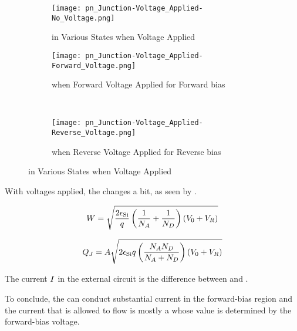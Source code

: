 \begin{figure}[h!tbp]
  \centering
  \begin{subfigure}{0.48\linewidth}
    \centering
    \texttt{[image: pn\_Junction-Voltage\_Applied-No\_Voltage.png]}
    \caption{\PNJunction{} in Various States when Voltage Applied}
    \label{fig:pn_Junction-Voltage_Applied-No_Voltage}
  \end{subfigure}
  \begin{subfigure}{0.48\linewidth}
    \centering
    \texttt{[image: pn\_Junction-Voltage\_Applied-Forward\_Voltage.png]}
    \caption{\PNJunction{} when Forward Voltage Applied for Forward bias}
    \label{fig:pn_Junction-Voltage_Applied-Forward_Voltage}
  \end{subfigure}
  \\
  \begin{subfigure}{0.48\linewidth}
    \centering
    \texttt{[image: pn\_Junction-Voltage\_Applied-Reverse\_Voltage.png]}
    \caption{\PNJunction{} when Reverse Voltage Applied for Reverse bias}
    \label{fig:pn_Junction-Voltage_Applied-Reverse_Voltage}
  \end{subfigure}
  \caption{\PNJunction{} in Various States when Voltage Applied \parencite[p.~156]{sedraTextbook7}}
  \label{fig:pn_Junction-Voltage_Applied}
\end{figure}

With voltages applied, the  changes a bit, as seen by .

\begin{equation}\label{eq:Depletion_Layer_Width-Voltage_Applied}
  W = \sqrt{\frac{2 \epsilon_{\mathrm{Si}}}{q} \left( \frac{1}{N_{A}} + \frac{1}{N_{D}} \right) (V_{0} + V_{R})}
\end{equation}

\begin{equation}\label{eq:Depletion_Layer_Charge-Voltage_Applied}
  Q_{J} = A \sqrt{2 \epsilon_{\mathrm{Si}} q \left( \frac{N_{A} N_{D}}{N_{A} + N_{D}} \right) (V_{0} + V_{R})}
\end{equation}

The current $I_{}$ in the external circuit is the difference between \DriftCurrent{} and \DiffusionCurrent{}.

\begin{blackbox}
  To conclude, the \PNJunction{} can conduct substantial current in the forward-bias region and the current that is allowed to flow is mostly a  whose value is determined by the forward-bias voltage.
\end{blackbox}

